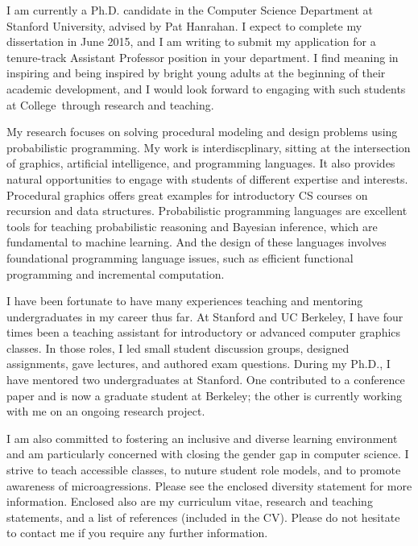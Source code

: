 \documentclass[10pt,stdletter,dateno,sigleft]{newlfm} %
\newcommand{\UniversityShort}{College}
\begin{document}
\begin{newlfm}


I am currently a Ph.D. candidate in the Computer Science Department at Stanford University, advised by Pat Hanrahan. I expect to complete my dissertation in June 2015, and I am writing to submit my application for a tenure-track Assistant Professor position in your department.
I find meaning in inspiring and being inspired by bright young adults at the beginning of their academic development, and I would look forward to engaging with such students at \UniversityShort~through research and teaching.

My research focuses on solving procedural modeling and design problems using probabilistic programming.
My work is interdiscplinary, sitting at the intersection of graphics, artificial intelligence, and programming languages. It also provides natural opportunities to engage with students of different expertise and interests. Procedural graphics offers great examples for introductory CS courses on recursion and data structures. Probabilistic programming languages are excellent tools for teaching probabilistic reasoning and Bayesian inference, which are fundamental to machine learning. And the design of these languages involves foundational programming language issues, such as efficient functional programming and incremental computation.

I have been fortunate to have many experiences teaching and mentoring undergraduates in my career thus far. At Stanford and UC Berkeley, I have four times been a teaching assistant for introductory or advanced computer graphics classes. In those roles, I led small student discussion groups, designed assignments, gave lectures, and authored exam questions. During my Ph.D., I have mentored two undergraduates at Stanford. One contributed to a conference paper and is now a graduate student at Berkeley; the other is currently working with me on an ongoing research project.

I am also committed to fostering an inclusive and diverse learning environment and am particularly concerned with closing the gender gap in computer science. I strive to teach accessible classes, to nuture student role models, and to promote awareness of microagressions.
Please see the enclosed diversity statement for more information.
Enclosed also are my curriculum vitae, research and teaching statements, and a list of references (included in the CV). Please do not hesitate to contact me if you require any further information.


\end{newlfm}
\end{document}

